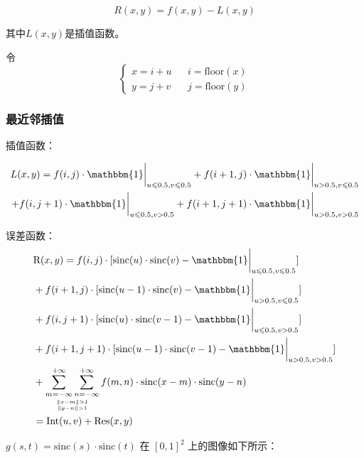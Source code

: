 \documentclass{article}
\begin{document}
$$R(x,y) = f(x,y) - L(x,y)$$

其中$L(x,y)$是插值函数。

令
\begin{equation}
	\left\{
		\begin{aligned}
			x = i + u && i = \mathrm{floor}(x)\\
			y = j + v && j = \mathrm{floor}(y)
		\end{aligned}
	\right.
\end{equation}

\subsubsection{最近邻插值}
插值函数：

\begin{equation}
	\begin{aligned}
	L(x,y) = f(i,j)\cdot\mathbbm{1}\bigg|_{u\leqslant 0.5, v\leqslant 0.5} + f(i+1,j)\cdot\mathbbm{1}\bigg|_{u > 0.5, v\leqslant 0.5} \\ 
	+ f(i,j+1)\cdot\mathbbm{1}\bigg|_{u\leqslant 0.5, v > 0.5} + f(i+1,j+1)\cdot \mathbbm{1} \bigg|_{u > 0.5, v > 0.5}
	\end{aligned}
\end{equation}

误差函数：
\begin{equation}
	\begin{aligned}
		& \mathrm{R}(x,y) = f(i,j) \cdot [\mathrm{sinc}(u) \cdot \mathrm{sinc}(v) - \mathbbm{1}\bigg|_{u\leqslant 0.5, v\leqslant 0.5}] \\
		& + f(i+1,j) \cdot [\mathrm{sinc}(u-1) \cdot \mathrm{sinc}(v) - \mathbbm{1}\bigg|_{u > 0.5, v\leqslant 0.5}]\\ 
		& + f(i,j+1) \cdot [\mathrm{sinc}(u) \cdot \mathrm{sinc}(v-1) - \mathbbm{1}\bigg|_{u\leqslant 0.5, v > 0.5}]\\ 
		& + f(i+1,j+1) \cdot [\mathrm{sinc}(u-1) \cdot \mathrm{sinc}(v-1) - \mathbbm{1}\bigg|_{u > 0.5, v > 0.5}]\\ 
		& + \mathop{\sum_{m=-\infty}^{+\infty}\sum_{n=-\infty}^{+\infty}}_{\|x-m\|>1\atop \|y-n\|>1} f(m,n)\cdot \mathrm{sinc}(x-m)\cdot \mathrm{sinc}(y-n)\\
		& = \mathrm{Int}(u,v) + \mathrm{Res}(x,y)
	\end{aligned}
\end{equation}

$g(s,t) = \mathrm{sinc}(s)\cdot \mathrm{sinc}(t)$ 在 $[0,1]^2$ 上的图像如下所示：
\end{document}
